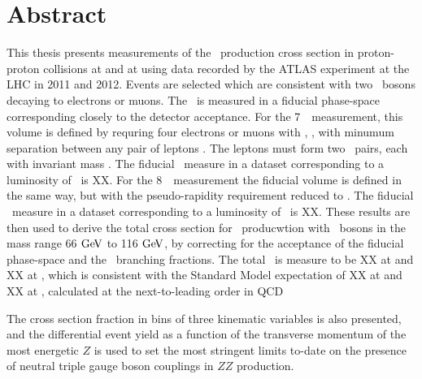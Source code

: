 \chapter*{Abstract}
This thesis presents measurements of the \ZZ\ production cross section in proton-proton collisions
at  and at  using data recorded by the ATLAS experiment 
at the LHC in 2011 and 2012.  
Events are selected which are consistent with two \Z\ bosons decaying to
electrons or muons. The \cx\ is measured in a fiducial phase-space corresponding
closely to the detector acceptance. For the 7~\tev\ measurement, this volume is
defined by requring four electrons or muons with , ,
with minumum separation between any pair of leptons . The leptons
must form two \ossf\ pairs, each with invariant mass \sstooos. The fiducial \cx\
measure in a dataset corresponding to a luminosity of
\LumiPassGRLTwentyEleven\ifb\ is XX. For the 8~\tev\ measurement the fiducial
volume is defined in the same way, but with the pseudo-rapidity requirement
reduced to \modetalt{2.7}. The fiducial \cx\
measure in a dataset corresponding to a luminosity of
\LumiPassGRLTwentyTwelve\ifb\ is XX.
These results are then used to derive the total cross section for \ZZ\
producwtion with \Z\ bosons in the mass range 66$\GeV$ to 116$\GeV$, by
correcting for the acceptance of the fiducial phase-space and the \Zll\
branching fractions. The total \cx\ is measure to be XX at  and XX at
\sqrtseq{8}, which is consistent with the Standard Model
expectation of XX at \sqrtseq{7} and XX at
\sqrtseq{8}, calculated at the next-to-leading order in QCD

The cross section fraction in bins of three kinematic variables is also presented, and 
the differential event yield as a function of the transverse momentum of the most energetic $Z$ 
is used to set the most stringent limits to-date on the presence of 
neutral triple gauge boson couplings in $ZZ$ production.
